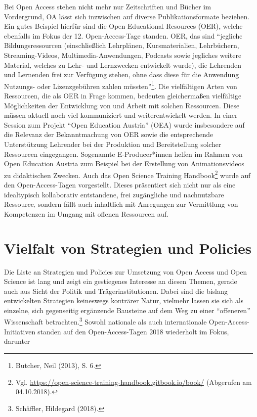 \documentclass[a4paper,
fontsize=11pt,
oneside,
numbers=noperiodatend,
parskip=half-,
bibliography=totoc,
final
]{scrartcl}
\begin{document}
Bei Open Access stehen nicht mehr nur Zeitschriften und Bücher im
Vordergrund, OA lässt sich inzwischen auf diverse Publikationsformate
beziehen. Ein gutes Beispiel hierfür sind die Open Educational Resources
(OER), welche ebenfalls im Fokus der 12. Open-Access-Tage standen. OER,
das sind \enquote{jegliche Bildungsressourcen (einschließlich
Lehrplänen, Kursmaterialien, Lehrbüchern, Streaming-Videos,
Multimedia-Anwendungen, Podcasts sowie jegliches weitere Material,
welches zu Lehr- und Lernzwecken entwickelt wurde), die Lehrenden und
Lernenden frei zur Verfügung stehen, ohne dass diese für die Anwendung
Nutzungs- oder Lizenzgebühren zahlen müssten}\footnote{Butcher, Neil
  (2013), S. 6.}. Die vielfältigen Arten von Ressourcen, die als OER in
Frage kommen, bedeuten gleichermaßen vielfältige Möglichkeiten der
Entwicklung von und Arbeit mit solchen Ressourcen. Diese müssen aktuell
noch viel kommuniziert und weiterentwickelt werden. In einer Session zum
Projekt \enquote{Open Education Austria} (OEA) wurde insbesondere auf
die Relevanz der Bekanntmachung von OER sowie die entsprechende
Unterstützung Lehrender bei der Produktion und Bereitstellung solcher
Ressourcen eingegangen. Sogenannte E-Producer*innen helfen im Rahmen von
Open Education Austria zum Beispiel bei der Erstellung von
Animationsvideos zu didaktischen Zwecken. Auch das Open Science Training
Handbook\footnote{Vgl.
  \url{https://open-science-training-handbook.gitbook.io/book/}
  (Abgerufen am 04.10.2018).} wurde auf den Open-Access-Tagen
vorgestellt. Dieses präsentiert sich nicht nur als eine idealtypisch
kollaborativ entstandene, frei zugängliche und nachnutzbare Ressource,
sondern fällt auch inhaltlich mit Anregungen zur Vermittlung von
Kompetenzen im Umgang mit offenen Ressourcen auf.

\hypertarget{vielfalt-von-strategien-und-policies}{%
\section{Vielfalt von Strategien und
Policies}\label{vielfalt-von-strategien-und-policies}}

Die Liste an Strategien und Policies zur Umsetzung von Open Access und
Open Science ist lang und zeigt ein gestiegenes Interesse an diesen
Themen, gerade auch aus Sicht der Politik und Trägerinstitutionen. Dabei
sind die bislang entwickelten Strategien keineswegs konträrer Natur,
vielmehr lassen sie sich als einzelne, sich gegenseitig ergänzende
Bausteine auf dem Weg zu einer \enquote{offeneren} Wissenschaft
betrachten.\footnote{Schäffler, Hildegard (2018).} Sowohl nationale als
auch internationale Open-Access-Initiativen standen auf den
Open-Access-Tagen 2018 wiederholt im Fokus, darunter
\end{document}
